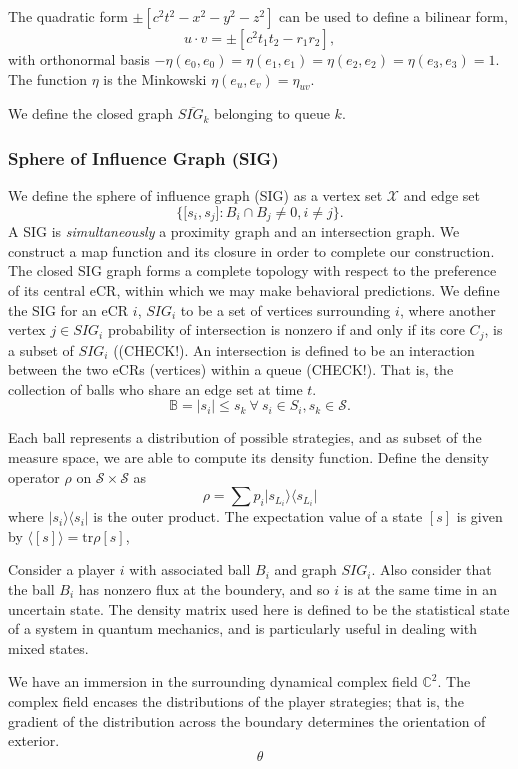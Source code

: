 \documentclass[10pt]{article}
\newcommand{\mcX}{\mathcal{X}}
\newcommand{\mcS}{\mathcal{S}}
\theoremstyle{definition}
\begin{document}
{The quadratic form $\pm [c^2t^2 - x^2 -y^2 - z^2]$ can be used to define a bilinear form,
$$  
   u\cdot v = \pm [c^2t_1t_2 - r_1r_2],
$$
with orthonormal basis $-\eta(e_0,e_0) = \eta(e_1,e_1) = \eta(e_2,e_2) =
\eta(e_3,e_3) = 1$.
The function $\eta$ is the Minkowski $\eta(e_u, e_v) = \eta_{uv}$.

We define the closed graph $\overline{SIG_k}$ belonging to queue $k$.

\subsubsection{Sphere of Influence Graph (SIG)}
 We define the sphere of influence graph
(SIG) as a vertex set $\mcX$ and edge set 
$$
    \lbrace\lbrack s_i, s_j\rbrack : B_i \cap B_j \ne 0, i\ne j\rbrace.
$$
A SIG is \emph{simultaneously} a proximity graph and an intersection graph. 
We construct a map function and its closure in order to complete our
construction. The closed SIG graph forms a complete topology with respect to the
preference of its central eCR, 
within which we may make behavioral predictions. We define the SIG for an
eCR $i$, $SIG_i$ to be a set of vertices surrounding $i$, where another vertex
$j\in SIG_i$ probability of intersection is nonzero if and only if its core
$C_j$, is a subset of $SIG_i$ ((CHECK!). An intersection is defined to
be an interaction between the two eCRs (vertices) within a queue (CHECK!).
That is, the collection of balls who share an edge set at time $t$.
$$
    \mathbb{B} = \vert s_i \vert \le s_k \ \forall \ s_i \in S_i,
    s_k \in \mcS.
$$

Each ball represents a distribution of possible strategies, and as subset of the
measure space, we are able to compute its density function. 
Define the density operator $\rho$ on $\mcS\times \mcS$ as
$$
    \rho = \displaystyle\sum p_i\vert s_{L_i}\rangle\langle s_{L_i}\vert
$$
where $\vert s_i\rangle\langle s_i\vert$ is the outer product. The expectation
value of a state $[s]$ is given by $\langle [s] \rangle = \text{tr}{\rho [s]}$,


Consider a player $i$ with associated ball $B_i$ and graph $SIG_i$. Also consider that the ball $B_i$ has nonzero flux
at the boundery, and so $i$ is at the same time in an uncertain state. The
density matrix used here is defined to be the statistical state of a system in
quantum mechanics, and is particularly useful in dealing with mixed states.

We have an immersion in the surrounding
dynamical complex field $\mathbb{C}^2$. The complex field encases the distributions of the
player strategies; that is, the gradient of the distribution across the boundary
determines the orientation of exterior.
$$
    \theta
$$



}
\end{document}
